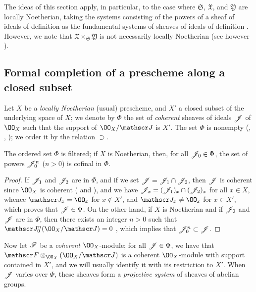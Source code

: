 \begin{env}[10.7.4]
The ideas of this section apply, in particular, to the case where $\mathfrak{S}$, $\mathfrak{X}$, and $\mathfrak{Y}$ are locally Noetherian, taking the systems consisting of the powers of a sheaf of ideals of definition  as the fundamental systems of sheaves of ideals of definition .
However, we note that $\mathfrak{X}\times_\mathfrak{S}\mathfrak{Y}$ is not necessarily locally Noetherian (see however ).
\end{env}

\subsection{Formal completion of a prescheme along a closed subset}
\label{subsection:1.10.8}

\begin{env}[10.8.1]
\label{1.10.8.1}
Let $X$ be a \emph{locally Noetherian} (usual) prescheme, and $X'$ a closed subset of the underlying space of $X$; we denote by $\Phi$ the set of \emph{coherent} sheaves of ideals $\mathscr{J}$ of $\OO_X$ such that the support of $\OO_X/\sh{J}$ is $X'$.
The set $\Phi$ is nonempty (, , ); we order it by the relation $\supset$.
\end{env}

\begin{lem}[10.8.2]
\label{1.10.8.2}
The ordered set $\Phi$ is filtered; if $X$ is Noetherian, then, for all $\mathscr{J}_0\in\Phi$, the set of powers $\mathscr{J}_0^n$ ($n>0$) is cofinal in $\Phi$.
\end{lem}

\begin{proof}
\label{proof-1.10.8.2}
If $\mathscr{J}_1$ and $\mathscr{J}_2$ are in $\Phi$, and if we set $\mathscr{J}=\mathscr{J}_1\cap\mathscr{J}_2$, then $\mathscr{J}$ is coherent since $\OO_X$ is coherent ( and ), and we have $\mathscr{J}_x=(\mathscr{J}_1)_x\cap(\mathscr{J}_2)_x$ for all $x\in X$, whence $\sh{J}_x=\OO_x$ for $x\not\in X'$, and $\sh{J}_x\neq\OO_x$ for $x\in X'$, which proves that $\mathscr{J}\in\Phi$.
On the other hand, if $X$ is Noetherian and if $\mathscr{J}_0$ and $\mathscr{J}$ are in $\Phi$, then there exists an integer $n>0$ such that $\sh{J}_0^n(\OO_X/\sh{J})=0$ , which implies that $\mathscr{J}_0^n\subset\mathscr{J}$.
\end{proof}

\begin{env}[10.8.3]
\label{1.10.8.2}
Now let $\mathscr{F}$ be a \emph{coherent} $\OO_X$-module; for all $\mathscr{J}\in\Phi$, we have that $\sh{F}\otimes_{\OO_X}(\OO_X/\sh{J})$ is a coherent $\OO_X$-module  with support contained in $X'$, and we will usually identify it with its restriction to $X'$.
When $\mathscr{J}$ varies over $\Phi$, these sheaves form a \emph{projective system} of sheaves of abelian groups.
\end{env}

